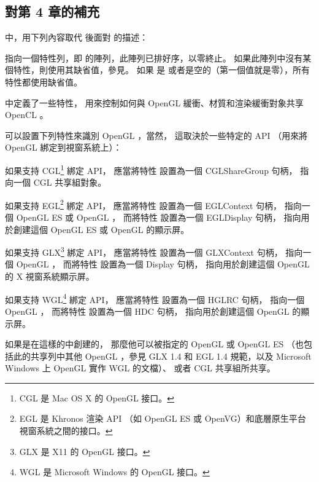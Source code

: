\subsection{對第 4 章的補充}

中，用下列內容取代  後面對  的描述：

 指向一個特性列，即  的陣列，此陣列已排好序，以零終止。
如果此陣列中沒有某個特性，則使用其缺省值，參見。
如果  是  或者是空的（第一個值就是零），所有特性都使用缺省值。

中定義了一些特性，
用來控制如何與 OpenGL 緩衝、材質和渲染緩衝對象共享 OpenCL 。

可以設置下列特性來識別 OpenGL ，當然，
這取決於一些特定的 API （用來將 OpenGL 綁定到視窗系統上）：
\startigBase
\item 如果支持 CGL\footnote{CGL 是 Mac OS X 的 OpenGL 接口。} 綁定 API，
應當將特性  設置為一個 CGLShareGroup 句柄，
指向一個 CGL 共享組對象。

\item 如果支持 EGL\footnote{%
EGL 是 Khronos 渲染 API （如 OpenGL ES 或 OpenVG）和底層原生平台視窗系統之間的接口。%
} 綁定 API，
應當將特性  設置為一個 EGLContext 句柄，
指向一個 OpenGL ES 或 OpenGL ，
而將特性  設置為一個 EGLDisplay 句柄，
指向用於創建這個 OpenGL ES 或 OpenGL 的顯示屏。

\item 如果支持 GLX\footnote{GLX 是 X11 的 OpenGL 接口。} 綁定 API，
應當將特性  設置為一個 GLXContext 句柄，
指向一個 OpenGL ，
而將特性  設置為一個 Display 句柄，
指向用於創建這個 OpenGL 的 X 視窗系統顯示屏。

\item 如果支持 WGL\footnote{WGL 是 Microsoft Windows 的 OpenGL 接口。} 綁定 API，
應當將特性  設置為一個 HGLRC 句柄，
指向一個 OpenGL ，
而將特性  設置為一個 HDC 句柄，
指向用於創建這個 OpenGL 的顯示屏。
\stopigBase

如果是在這樣的中創建的，
那麼他可以被指定的 OpenGL 或 OpenGL ES 
（也包括此的共享列中其他 OpenGL ，參見 GLX 1.4 和 EGL 1.4 規範，以及 Microsoft Windows 上 OpenGL 實作 WGL 的文檔）、
或者 CGL 共享組所共享。

